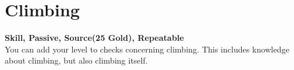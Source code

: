 \section{Climbing}\label{sec:climbing}
\textbf{Skill, Passive, Source(25 Gold), Repeatable}\\
You can add your level to checks concerning climbing.
This includes knowledge about climbing, but also climbing itself.